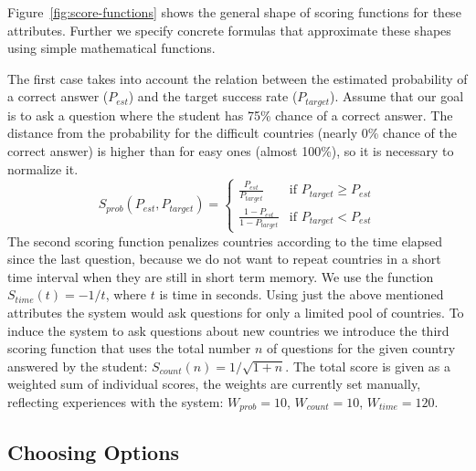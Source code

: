 \documentclass{edm_template}
\begin{document}
Figure~\ref{fig:score-functions} shows the general shape of scoring functions
for these attributes. Further we specify concrete formulas that
approximate these shapes using simple mathematical functions.

The first case takes into account the relation between the estimated
probability of a correct answer ($P_{\mathit{est}}$) and the target success
rate ($P_{\mathit{target}}$). Assume that our goal is to ask a question where
the student has 75\% chance of a correct answer. The distance from the
probability for the difficult countries (nearly 0\% chance of the correct
answer) is higher than for easy ones (almost 100\%), so it is necessary to
normalize it.
\begin{displaymath}
  S_\mathit{prob}(P_\mathit{est}, P_\mathit{target}) =
  \left\{  \begin{array}{ll}
      \frac{P_{\mathit{est}}}{P_{\mathit{target}}}  & \mbox{if } P_{\mathit{target}} \geq P_{\mathit{est}} \\
      \frac{1 - P_{\mathit{est}}}{1 - P_{\mathit{target}}} & \mbox{if } P_{\mathit{target}} < P_{\mathit{est}}
    \end{array}
  \right.
\end{displaymath}
The second scoring function penalizes countries according to the time elapsed
since the last question, because we do not want to repeat countries in a short
time interval when they are still in short term memory. We use the function
$S_{time}(t) = - 1/t$, where $t$ is time in seconds. Using just the above
mentioned attributes the system would ask questions for only a limited pool of
countries. To induce the system to ask questions about new countries we
introduce the third scoring function that uses the total number $n$ of
questions for the given country answered by the student: $S_\mathit{count}(n) =
1/\sqrt{1 + n}$. The total score is given as a weighted sum of individual
scores, the weights are currently set manually, reflecting experiences with the
system: $W_\mathit{prob} = 10$, $W_\mathit{count} = 10$, $W_\mathit{time} =
120$.


\subsection{Choosing Options}
\end{document}
